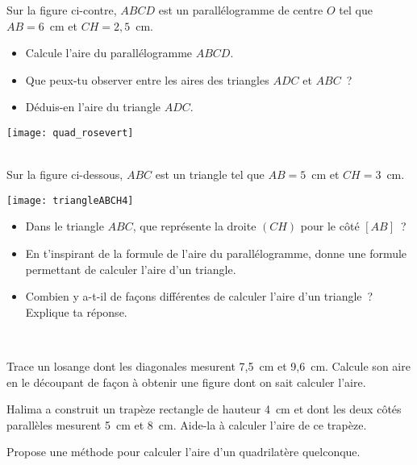 \begin{activite}
\begin{partie}
\begin{minipage}[c]{0.48\linewidth}
Sur la figure ci-contre, $ABCD$ est un parallélogramme de centre $O$ tel que $AB = 6$ cm et $CH = 2,5$ cm.
\begin{itemize}
 \item Calcule l'aire du parallélogramme $ABCD$.
 \item Que peux-tu observer entre les aires des triangles $ADC$ et $ABC$ ?
 \item Déduis-en l'aire du triangle $ADC$. 
 \end{itemize}
 \end{minipage} \hfill%
 \begin{minipage}[c]{0.48\linewidth}
  \texttt{[image: quad\_rosevert]}
  \end{minipage} \\[1em]
  Sur la figure ci-dessous, $ABC$ est un triangle tel que $AB = 5$ cm et $CH = 3$ cm. \\[1em]
  \begin{minipage}[c]{0.42\linewidth}
   \texttt{[image: triangleABCH4]} 
   \end{minipage} \hfill%
  \begin{minipage}[c]{0.54\linewidth}
  \begin{itemize}
  \item Dans le triangle $ABC$, que représente la droite $(CH)$ pour le côté $[AB]$ ?
  \item En t’inspirant de la formule de l’aire du parallélogramme, donne une formule permettant de calculer l’aire d’un triangle. 
  \item Combien y a-t-il de façons différentes de calculer l'aire d'un triangle ? Explique ta réponse.
  \end{itemize}
    \end{minipage} \\
\end{partie}

\end{activite}


\begin{activite}

\begin{partie}
Trace un losange dont les diagonales mesurent 7,5 cm et 9,6 cm. Calcule son aire en le découpant de façon à obtenir une figure dont on sait calculer l'aire.
\end{partie}

\begin{partie}
Halima a construit un trapèze rectangle de hauteur 4 cm et dont les deux côtés parallèles mesurent 5 cm et 8 cm. Aide-la à calculer l’aire de ce trapèze.
\end{partie}

\begin{partie}
Propose une méthode pour calculer l'aire d'un quadrilatère quelconque.
\end{partie}

\end{activite}

